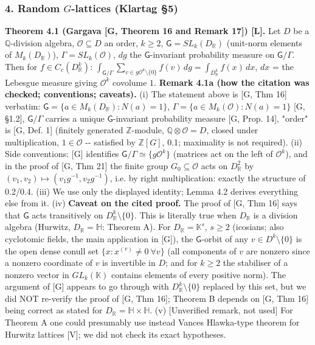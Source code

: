 \hypertarget{random-g-lattices-klartag-5}{%
\subsubsection*{\texorpdfstring{4. Random \(G\)-lattices (Klartag §5)}{4. Random G-lattices (Klartag §5)}}\label{random-g-lattices-klartag-5}}

\textbf{Theorem 4.1 (Gargava {[}G, Theorem 16 and Remark 17{]}) {[}L{]}.} Let \(D\) be a \(\mathbb Q\)-division algebra, \(\mathcal O\subseteq D\) an order, \(k\ge2\), \(\mathsf G=SL_k(D_{\mathbb R})\)
(unit-norm elements of \(M_k(D_\mathbb R)\)), \(\Gamma=SL_k(\mathcal O)\), \(dg\) the \(\mathsf G\)-invariant probability measure on \(\mathsf G/\Gamma\). Then for \(f\in C_c(D_{\mathbb R}^k)\):
\(\int_{\mathsf G/\Gamma}\sum_{v\in g\mathcal O^k\setminus\{0\}}f(v)\,dg=\int_{D_{\mathbb R}^k}f(x)\,dx\), \(dx\) = the Lebesgue measure giving \(\mathcal O^k\) covolume \(1\).
\textbf{Remark 4.1a (how the citation was checked; conventions; caveats).} (i) The statement above is {[}G, Thm 16{]} verbatim: \(\mathsf G=\{a\in M_k(D_\mathbb R):N(a)=1\}\), \(\Gamma=\{a\in M_k(\mathcal O):N(a)=1\}\) {[}G, §1.2{]}, \(\mathsf G/\Gamma\) carries a unique \(\mathsf G\)-invariant probability measure {[}G, Prop. 14{]}, "order" is {[}G, Def. 1{]} (finitely generated \(\mathbb Z\)-module, \(\mathbb Q\otimes\mathcal O=D\), closed under multiplication, \(1\in\mathcal O\) -\/- satisfied by \(\mathbb Z[G]\), 0.1; maximality is not required). (ii) Side conventions: {[}G{]} identifies \(\mathsf G/\Gamma\simeq\{g\mathcal O^k\}\) (matrices act on the left of \(\mathcal O^k\)), and in the proof of {[}G, Thm 21{]} the finite group \(G_0\subseteq\mathcal O\) acts on \(D_\mathbb R^2\) by \((v_1,v_2)\mapsto(v_1g^{-1},v_2g^{-1})\), i.e. by right multiplication: exactly the structure of 0.2/0.4. (iii) We use only the displayed identity; Lemma 4.2 derives everything else from it. (iv) \textbf{Caveat on the cited proof.} The proof of {[}G, Thm 16{]} says that \(\mathsf G\) acts transitively on \(D_\mathbb R^k\setminus\{0\}\). This is literally true when \(D_\mathbb R\) is a division algebra (Hurwitz, \(D_\mathbb R=\mathbb H\): Theorem A). For \(D_\mathbb R=\mathbb K^s\), \(s\ge2\) (icosians; also cyclotomic fields, the main application in {[}G{]}), the \(\mathsf G\)-orbit of any \(v\in D^k\setminus\{0\}\) is the open dense conull set \(\{x:x^{(v)}\ne0\ \forall v\}\) (all components of \(v\) are nonzero since a nonzero coordinate of \(v\) is invertible in \(D\); and for \(k\ge2\) the stabiliser of a nonzero vector in \(GL_k(\mathbb K)\) contains elements of every positive norm). The argument of {[}G{]} appears to go through with \(D_\mathbb R^k\setminus\{0\}\) replaced by this set, but we did NOT re-verify the proof of {[}G, Thm 16{]}; Theorem B depends on {[}G, Thm 16{]} being correct as stated for \(D_\mathbb R=\mathbb H\times\mathbb H\). (v) {[}Unverified remark, not used{]} For Theorem A one could presumably use instead Vance\textquotesingle s Hlawka-type theorem for Hurwitz lattices {[}V{]}; we did not check its exact hypotheses.

